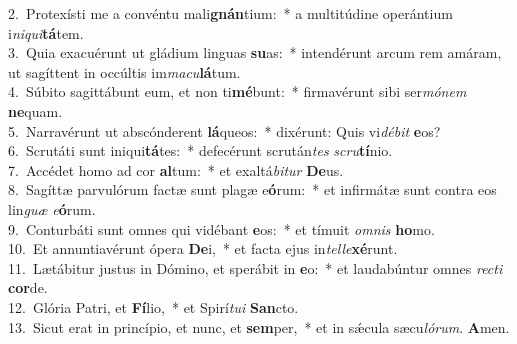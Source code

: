 {2.~}Protexísti me a convéntu mali\textbf{gnán}tium:~* a multitúdine operántium i\textit{ni}\textit{qui}\textbf{tá}tem.\\
{3.~}Quia exacuérunt ut gládium linguas \textbf{su}as:~* intendérunt arcum rem amáram, ut sagíttent in occúltis im\textit{ma}\textit{cu}\textbf{lá}tum.\\
{4.~}Súbito sagittábunt eum, et non ti\textbf{mé}bunt:~* firmavérunt sibi ser\textit{mó}\textit{nem} \textbf{ne}quam.\\
{5.~}Narravérunt ut abscónderent \textbf{lá}queos:~* dixérunt: Quis vi\textit{dé}\textit{bit} \textbf{e}os?\\
{6.~}Scrutáti sunt iniqui\textbf{tá}tes:~* defecérunt scrután\textit{tes} \textit{scru}\textbf{tí}nio.\\
{7.~}Accédet homo ad cor \textbf{al}tum:~* et exaltá\textit{bi}\textit{tur} \textbf{De}us.\\
{8.~}Sagíttæ parvulórum factæ sunt plagæ e\textbf{ó}rum:~* et infirmátæ sunt contra eos lin\textit{guæ} \textit{e}\textbf{ó}rum.\\
{9.~}Conturbáti sunt omnes qui vidébant \textbf{e}os:~* et tímuit \textit{om}\textit{nis} \textbf{ho}mo.\\
{10.~}Et annuntiavérunt ópera \textbf{De}i,~* et facta ejus in\textit{tel}\textit{le}\textbf{xé}runt.\\
{11.~}Lætábitur justus in Dómino, et sperábit in \textbf{e}o:~* et laudabúntur omnes \textit{re}\textit{cti} \textbf{cor}de.\\
{12.~}Glória Patri, et \textbf{Fí}lio,~* et Spirí\textit{tu}\textit{i} \textbf{San}cto.\\
{13.~}Sicut erat in princípio, et nunc, et \textbf{sem}per,~* et in sǽcula sæcu\textit{ló}\textit{rum}. \textbf{A}men.\\

